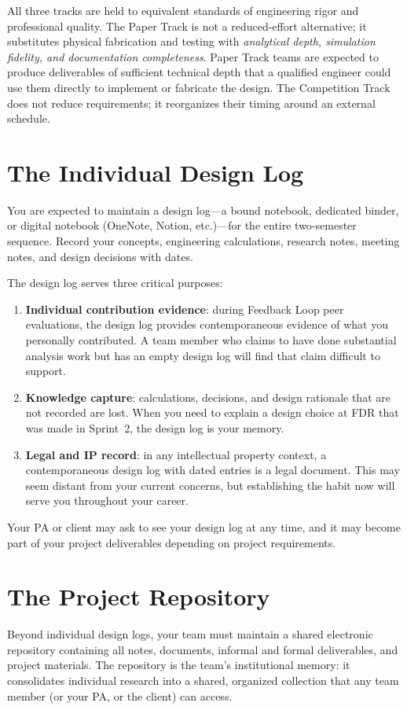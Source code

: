 \begin{warningbox}
All three tracks are held to equivalent standards of engineering rigor and professional quality. The Paper Track is not a reduced-effort alternative; it substitutes physical fabrication and testing with \emph{analytical depth, simulation fidelity, and documentation completeness}. Paper Track teams are expected to produce deliverables of sufficient technical depth that a qualified engineer could use them directly to implement or fabricate the design. The Competition Track does not reduce requirements; it reorganizes their timing around an external schedule.
\end{warningbox}


\section{The Individual Design Log}
You are expected to maintain a design log---a bound notebook, dedicated binder, or digital notebook (OneNote, Notion, etc.)---for the entire two-semester sequence. Record your concepts, engineering calculations, research notes, meeting notes, and design decisions with dates.

The design log serves three critical purposes:
\begin{enumerate}[nosep,leftmargin=1.5em]
\item \textbf{Individual contribution evidence}: during Feedback Loop peer evaluations, the design log provides contemporaneous evidence of what you personally contributed. A team member who claims to have done substantial analysis work but has an empty design log will find that claim difficult to support.
\item \textbf{Knowledge capture}: calculations, decisions, and design rationale that are not recorded are lost. When you need to explain a design choice at FDR that was made in Sprint~2, the design log is your memory.
\item \textbf{Legal and IP record}: in any intellectual property context, a contemporaneous design log with dated entries is a legal document. This may seem distant from your current concerns, but establishing the habit now will serve you throughout your career.
\end{enumerate}

Your PA or client may ask to see your design log at any time, and it may become part of your project deliverables depending on project requirements.


\section{The Project Repository}
Beyond individual design logs, your team must maintain a shared electronic repository containing all notes, documents, informal and formal deliverables, and project materials. The repository is the team's institutional memory: it consolidates individual research into a shared, organized collection that any team member (or your PA, or the client) can access.

